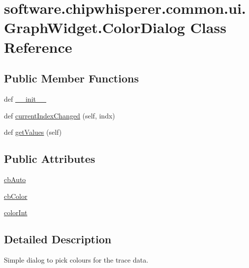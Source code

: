 \hypertarget{classsoftware_1_1chipwhisperer_1_1common_1_1ui_1_1GraphWidget_1_1ColorDialog}{}\section{software.\+chipwhisperer.\+common.\+ui.\+Graph\+Widget.\+Color\+Dialog Class Reference}
\label{classsoftware_1_1chipwhisperer_1_1common_1_1ui_1_1GraphWidget_1_1ColorDialog}
\subsection*{Public Member Functions}
\begin{DoxyCompactItemize}
\item 
def \hyperlink{classsoftware_1_1chipwhisperer_1_1common_1_1ui_1_1GraphWidget_1_1ColorDialog_ab72ef5ec3f8bf14fae06b3c95e2ff1b8}{\+\_\+\+\_\+init\+\_\+\+\_\+}
\item 
def \hyperlink{classsoftware_1_1chipwhisperer_1_1common_1_1ui_1_1GraphWidget_1_1ColorDialog_a84e27fa5eb2bc5a0282a29f7274b97ba}{current\+Index\+Changed} (self, indx)
\item 
def \hyperlink{classsoftware_1_1chipwhisperer_1_1common_1_1ui_1_1GraphWidget_1_1ColorDialog_ad6fe68579523887c02e90d10f6fda0b5}{get\+Values} (self)
\end{DoxyCompactItemize}
\subsection*{Public Attributes}
\begin{DoxyCompactItemize}
\item 
\hyperlink{classsoftware_1_1chipwhisperer_1_1common_1_1ui_1_1GraphWidget_1_1ColorDialog_a3434fbb313b6184880eda429dc5137e2}{cb\+Auto}
\item 
\hyperlink{classsoftware_1_1chipwhisperer_1_1common_1_1ui_1_1GraphWidget_1_1ColorDialog_a98e4aea598edf40302ef87c432a02b16}{cb\+Color}
\item 
\hyperlink{classsoftware_1_1chipwhisperer_1_1common_1_1ui_1_1GraphWidget_1_1ColorDialog_acaecfb6a19402664b7020f129377b3e8}{color\+Int}
\end{DoxyCompactItemize}


\subsection{Detailed Description}
\begin{DoxyVerb}Simple dialog to pick colours for the trace data.
\end{DoxyVerb}
 

